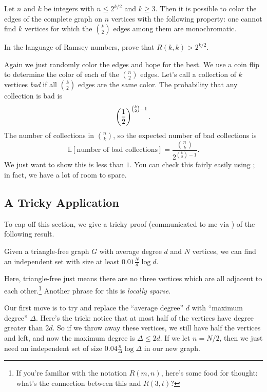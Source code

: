 \documentclass[11pt]{scrartcl}
\newcommand\EE{\mathbb E}
\begin{document}
\begin{example}
	 Let $n$ and $k$ be integers with $n \le 2^{k/2}$ and $k \ge 3$.
	Then it is possible to color the edges of the complete graph on $n$ vertices
	with the following property:
	one cannot find $k$ vertices for which the $\binom k2$ edges among them
	are monochromatic.
\end{example}
\begin{remark*}
	In the language of Ramsey numbers, prove that $R(k,k) > 2^{k/2}$.
\end{remark*}
\begin{soln}
	Again we just randomly color the edges and hope for the best.
	We use a coin flip to determine the color of each of the $\binom n2$ edges.
	Let's call a collection of $k$ vertices \emph{bad} if all $\binom k2$ edges are the same color.
	The probability that any collection is bad is
	\[ \left( \frac{1}{2} \right)^{\binom k2 - 1}. \]
	The number of collections in $\binom nk$, so the expected number of bad collections is
	\[ \EE[\text{number of bad collections}] = \frac{\binom nk}{2^{\binom k2 - 1}}. \]
	We just want to show this is less than $1$.
	You can check this fairly easily using ; in fact, we have a lot of room to spare.
\end{soln}

\subsection{A Tricky Application}
To cap off this section, we give a tricky proof (communicated to me via \cite{potalk})
of the following result.

\begin{theorem}
	Given a triangle-free graph $G$ with average degree $d$ and $N$ vertices,
	we can find an independent set with size at least $0.01 \frac{N}{d} \log d$.
\end{theorem}

Here, triangle-free just means there are no three vertices which are all adjacent to each other.\footnote{If you're familiar with the notation $R(m,n)$, here's some food for thought: what's the connection between this and $R(3,t)$?}
Another phrase for this is \emph{locally sparse}.

Our first move is to try and replace the ``average degree'' $d$ with ``maximum degree'' $\Delta$.
Here's the trick: notice that at most half of the vertices have degree greater than $2d$.
So if we throw away these vertices, we still have half the vertices and left, and now the maximum
degree is $\Delta \le 2d$.
If we let $n = N/2$, then we just need an independent set of size $0.04 \frac{n}{\Delta} \log \Delta$
in our new graph.
\end{document}
